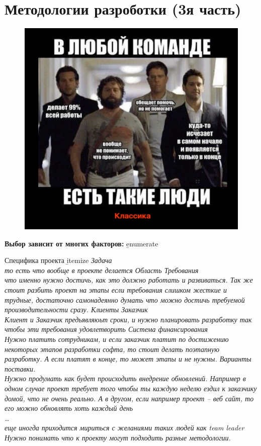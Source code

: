 \documentclass[12pt; a4paper]{book}
\theoremstyle{plain} %
\theoremstyle{defenition}
\theoremstyle{remark}
\begin{document}
\section{Методологии разроботки (3я часть)}
\begin{figure}[!htbp]
\includegraphics[angle=0, width=\textwidth]{IMG/10} \\
\end{figure}

\textbf{Выбор зависит от многих факторов:}
\b{enumerate}
\item Специфика проекта
    \b{itemize}
    \it Задача\\
    {\normalsize то есть что вообще в проекте делается}
    \it Область
    \it Требования\\
    {\normalsize что именно нужно достичь, как это должно работать и развиваться. Так же стоит разбить проект на этапы если требования слишком жесткие и трудные, достаточно самонадеянно думать что можно достичь требуемой производительности сразу.}
    \it Клиенты
    \it Заказчик\\
    {\normalsize Клиент и Заказчик предьявляюьт сроки, и нужно планировать разработку так чтобы эти требования удовлетворить}
\it Система финансирования\\
{\normalsize Нужно платить сотрудникам, и если заказчик платит по достижению некоторых этапов разработки софта, то стоит делать поэтапную разработку. А если платят в конце, то может этапы и не нужны.}
\it Варианты поставки.\\
{\normalsize Нужно продумать как будет происходить внедрение обновлений. Например в одном случае проект требует того чтобы ты каждую неделю ездил к заказчику
домой, что не очень реально. А в другом, если например проект -- веб сайт, то его можно обновлять 
хоть каждый день}\\
\it \ldots\\ 
{\normalsize еще иногда приходится мириться с желаниями таких людей как team leader}
Нужно понимать что к проекту могут подходить разные методологии.
\end{document}
